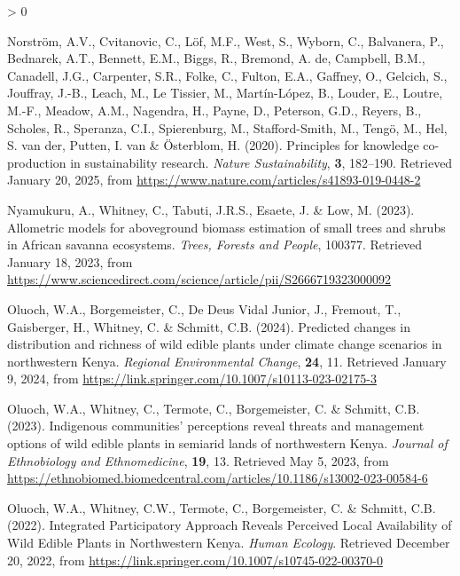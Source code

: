 \documentclass[
]{article}
\newlength{\cslhangindent}
\newenvironment{CSLReferences}[2] %
 {%
  \setlength{\parindent}{0pt}
  \ifodd #1 \everypar{\setlength{\hangindent}{\cslhangindent}}\ignorespaces\fi
  \ifnum #2 > 0
  \setlength{\parskip}{#2\baselineskip}
  \fi
 }%
 {}
\begin{document}
\begin{CSLReferences}{1}{0}
\leavevmode{}%
Norström, A.V., Cvitanovic, C., Löf, M.F., West, S., Wyborn, C.,
Balvanera, P., Bednarek, A.T., Bennett, E.M., Biggs, R., Bremond, A. de,
Campbell, B.M., Canadell, J.G., Carpenter, S.R., Folke, C., Fulton,
E.A., Gaffney, O., Gelcich, S., Jouffray, J.-B., Leach, M., Le Tissier,
M., Martín-López, B., Louder, E., Loutre, M.-F., Meadow, A.M., Nagendra,
H., Payne, D., Peterson, G.D., Reyers, B., Scholes, R., Speranza, C.I.,
Spierenburg, M., Stafford-Smith, M., Tengö, M., Hel, S. van der, Putten,
I. van \& Österblom, H. (2020). Principles for knowledge co-production
in sustainability research. \emph{Nature Sustainability}, \textbf{3},
182--190. Retrieved January 20, 2025, from
\url{https://www.nature.com/articles/s41893-019-0448-2}

\leavevmode{}%
Nyamukuru, A., Whitney, C., Tabuti, J.R.S., Esaete, J. \& Low, M.
(2023). Allometric models for aboveground biomass estimation of small
trees and shrubs in {African} savanna ecosystems. \emph{Trees, Forests
and People}, 100377. Retrieved January 18, 2023, from
\url{https://www.sciencedirect.com/science/article/pii/S2666719323000092}

\leavevmode{}%
Oluoch, W.A., Borgemeister, C., De Deus Vidal Junior, J., Fremout, T.,
Gaisberger, H., Whitney, C. \& Schmitt, C.B. (2024). Predicted changes
in distribution and richness of wild edible plants under climate change
scenarios in northwestern {Kenya}. \emph{Regional Environmental Change},
\textbf{24}, 11. Retrieved January 9, 2024, from
\url{https://link.springer.com/10.1007/s10113-023-02175-3}

\leavevmode{}%
Oluoch, W.A., Whitney, C., Termote, C., Borgemeister, C. \& Schmitt,
C.B. (2023). Indigenous communities' perceptions reveal threats and
management options of wild edible plants in semiarid lands of
northwestern {Kenya}. \emph{Journal of Ethnobiology and Ethnomedicine},
\textbf{19}, 13. Retrieved May 5, 2023, from
\url{https://ethnobiomed.biomedcentral.com/articles/10.1186/s13002-023-00584-6}

\leavevmode{}%
Oluoch, W.A., Whitney, C.W., Termote, C., Borgemeister, C. \& Schmitt,
C.B. (2022). Integrated {Participatory} {Approach} {Reveals} {Perceived}
{Local} {Availability} of {Wild} {Edible} {Plants} in {Northwestern}
{Kenya}. \emph{Human Ecology}. Retrieved December 20, 2022, from
\url{https://link.springer.com/10.1007/s10745-022-00370-0}


\end{CSLReferences}
\end{document}
